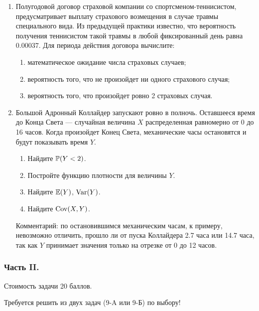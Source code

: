 \begin{enumerate}
\item Полугодовой договор страховой компании со спортсменом-теннисистом,
предусматривает выплату страхового возмещения  в случае травмы специального вида.
Из предыдущей практики известно, что вероятность получения теннисистом такой травмы
в любой фиксированный день равна $0.00037$. Для периода действия договора вычислите:
\begin{enumerate}
\item математическое ожидание числа страховых случаев;
\item вероятность того, что не произойдет ни одного страхового случая;
\item вероятность того, что произойдет ровно 2 страховых случая.
\end{enumerate}

\item Большой Адронный Коллайдер запускают ровно в полночь. Оставшееся время до
Конца Света — случайная величина $X$ распределенная равномерно от 0 до 16 часов.
Когда произойдет Конец Света, механические часы остановятся и будут показывать время $Y$.
\begin{enumerate}
\item Найдите $\P(Y < 2)$.
\item Постройте функцию плотности для величины $Y$.
\item Найдите $\E(Y)$, $\Var(Y)$.
\item Найдите $\Cov(X, Y)$.
\end{enumerate}
Комментарий: по остановившимся механическим часам, к примеру, невозможно отличить,
прошло ли от пуска Коллайдера 2.7 часа или 14.7 часа, так как $Y$ принимает значения
только на отрезке от 0 до 12 часов.
\end{enumerate}

\subsubsection*{Часть II.}

Стоимость задачи 20 баллов.

Требуется решить \textbf{} из двух задач (9-A или 9-Б) по
выбору!

